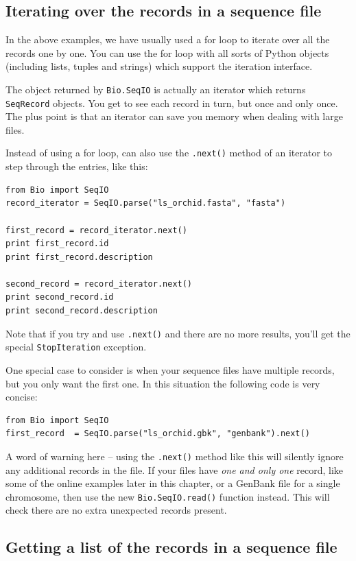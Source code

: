 \documentclass{report}
\begin{document}
\subsection{Iterating over the records in a sequence file}

In the above examples, we have usually used a for loop to iterate over all the records one by one.  You can use the for loop with all sorts of Python objects (including lists, tuples and strings) which support the iteration interface.

The object returned by \verb|Bio.SeqIO| is actually an iterator which returns \verb|SeqRecord| objects.  You get to see each record in turn, but once and only once.  The plus point is that an iterator can save you memory when dealing with large files.

Instead of using a for loop, can also use the \verb|.next()| method of an iterator to step through the entries, like this:

\begin{verbatim}
from Bio import SeqIO
record_iterator = SeqIO.parse("ls_orchid.fasta", "fasta")

first_record = record_iterator.next()
print first_record.id
print first_record.description

second_record = record_iterator.next()
print second_record.id
print second_record.description
\end{verbatim}

Note that if you try and use \verb|.next()| and there are no more results, you'll get the special \verb|StopIteration| exception.

One special case to consider is when your sequence files have multiple records, but you only want the first one.  In this situation the following code is very concise:

\begin{verbatim}
from Bio import SeqIO
first_record  = SeqIO.parse("ls_orchid.gbk", "genbank").next()
\end{verbatim}

A word of warning here -- using the \verb|.next()| method like this will silently ignore any additional records in the file.
If your files have {\it one and only one} record, like some of the online examples later in this chapter, or a GenBank file for a single chromosome, then use the new \verb|Bio.SeqIO.read()| function instead.
This will check there are no extra unexpected records present.

\subsection{Getting a list of the records in a sequence file}
\end{document}
